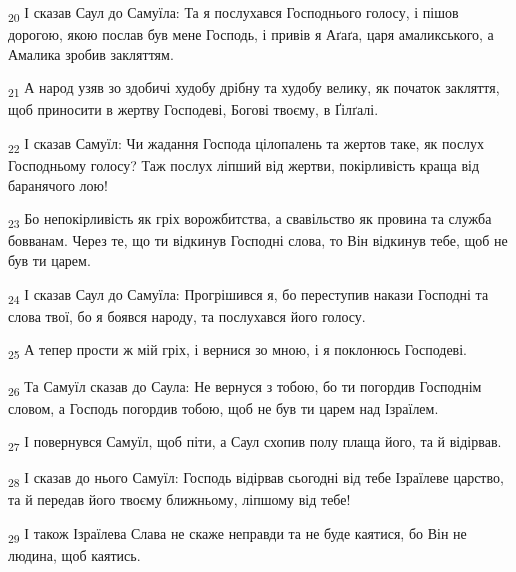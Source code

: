 \begin{tcolorbox}
\textsubscript{20} І сказав Саул до Самуїла: Та я послухався Господнього голосу, і пішов дорогою, якою послав був мене Господь, і привів я Аґаґа, царя амаликського, а Амалика зробив закляттям.
\end{tcolorbox}
\begin{tcolorbox}
\textsubscript{21} А народ узяв зо здобичі худобу дрібну та худобу велику, як початок закляття, щоб приносити в жертву Господеві, Богові твоєму, в Ґілґалі.
\end{tcolorbox}
\begin{tcolorbox}
\textsubscript{22} І сказав Самуїл: Чи жадання Господа цілопалень та жертов таке, як послух Господньому голосу? Таж послух ліпший від жертви, покірливість краща від баранячого лою!
\end{tcolorbox}
\begin{tcolorbox}
\textsubscript{23} Бо непокірливість як гріх ворожбитства, а свавільство як провина та служба бовванам. Через те, що ти відкинув Господні слова, то Він відкинув тебе, щоб не був ти царем.
\end{tcolorbox}
\begin{tcolorbox}
\textsubscript{24} І сказав Саул до Самуїла: Прогрішився я, бо переступив накази Господні та слова твої, бо я боявся народу, та послухався його голосу.
\end{tcolorbox}
\begin{tcolorbox}
\textsubscript{25} А тепер прости ж мій гріх, і вернися зо мною, і я поклонюсь Господеві.
\end{tcolorbox}
\begin{tcolorbox}
\textsubscript{26} Та Самуїл сказав до Саула: Не вернуся з тобою, бо ти погордив Господнім словом, а Господь погордив тобою, щоб не був ти царем над Ізраїлем.
\end{tcolorbox}
\begin{tcolorbox}
\textsubscript{27} І повернувся Самуїл, щоб піти, а Саул схопив полу плаща його, та й відірвав.
\end{tcolorbox}
\begin{tcolorbox}
\textsubscript{28} І сказав до нього Самуїл: Господь відірвав сьогодні від тебе Ізраїлеве царство, та й передав його твоєму ближньому, ліпшому від тебе!
\end{tcolorbox}
\begin{tcolorbox}
\textsubscript{29} І також Ізраїлева Слава не скаже неправди та не буде каятися, бо Він не людина, щоб каятись.
\end{tcolorbox}
